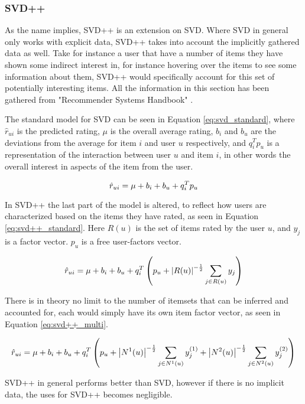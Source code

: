 \subsubsection{SVD++} \label{bg:mf_svd++}
As the name implies, SVD++ is an extension on SVD. Where SVD in general only works with explicit data, SVD++ takes into account the implicitly gathered data as well. Take for instance a user that have a number of items they have shown some indirect interest in, for instance hovering over the items to see some information about them, SVD++ would specifically account for this set of potentially interesting items. All the information in this section has been gathered from "Recommender Systems Handbook" \cite{recsyshandbook}.


 
The standard model for SVD can be seen in Equation \ref{eq:svd_standard}, where $\hat{r}_{ui}$ is the predicted rating, $\mu$ is the overall average rating, $b_{i}$ and $b_{u}$ are the deviations from the average for item $i$ and user $u$ respectively, and $q_{i}^{T}p_{u}$ is a representation of the interaction between user $u$ and item $i$, in other words the overall interest in aspects of the item from the user.

\begin{equation} \label{eq:svd_standard}
\centering
\hat{r}_{ui} = \mu + b_{i} + b_{u} + q_{i}^{T}p_{u}
\end{equation}

In SVD++ the last part of the model is altered, to reflect how users are characterized based on the items they have rated, as seen in Equation \ref{eq:svd++_standard}. Here $R(u)$ is the set of items rated by the user $u$, and $y_{j}$ is a factor vector. $p_{u}$ is a free user-factors vector.

\begin{equation} \label{eq:svd++_standard}
\centering
\hat{r}_{ui} = \mu + b_{i} + b_{u} + q_{i}^{T}\left (p_{u} + \left | R(u) \right |^{-\frac{1}{2}} \sum_{j\in R(u)} y_{j} \right )
\end{equation}

There is in theory no limit to the number of itemsets that can be inferred and accounted for, each would simply have its own item factor vector, as seen in Equation \ref{eq:svd++_multi}.

\begin{equation} \label{eq:svd++_multi}
\centering
\hat{r}_{ui} = \mu + b_{i} + b_{u} + q_{i}^{T}\left (p_{u} + \left | N^{1}(u) \right |^{-\frac{1}{2}} \sum_{j\in N^{1}(u)} y_{j}^{(1)} + \left | N^{2}(u) \right |^{-\frac{1}{2}} \sum_{j\in N^{2}(u)} y_{j}^{(2)} \right )
\end{equation}

SVD++ in general performs better than SVD, however if there is no implicit data, the uses for SVD++ becomes negligible.